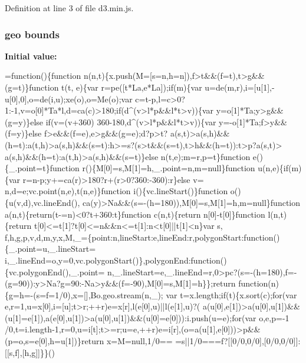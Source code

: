 Definition at line 3 of file d3.\+min.\+js.

\subsubsection[{bounds}]{ {\bf geo} bounds}\label{d3_8min_8js_a55fcc96d050b51f3db051ef3876a8720}
{\bfseries Initial value\+:}
\begin{DoxyCode}
=\textcolor{keyword}{function}()\{\textcolor{keyword}{function} n(n,t)\{x.push(M=[s=n,h=n]),f>t&&(f=t),t>g&&(g=t)\}\textcolor{keyword}{function} t(t,
      e)\{var r=pe([t*La,e*La]);\textcolor{keywordflow}{if}(m)\{var u=de(m,r),i=[u[1],-u[0],0],o=de(i,u);xe(o),o=Me(o);var 
      c=t-p,l=c>0?1:-1,v=o[0]*Ta*l,d=ca(c)>180;\textcolor{keywordflow}{if}(d^(v>l*p&&l*t>v))\{var y=o[1]*Ta;y>g&&(g=y)\}\textcolor{keywordflow}{else} \textcolor{keywordflow}{if}(v=(v+360)%
      360-180,d^(v>l*p&&l*t>v))\{var y=-o[1]*Ta;f>y&&(f=y)\}\textcolor{keywordflow}{else} f>e&&(f=e),e>g&&(g=e);d?p>t?
      a(s,t)>a(s,h)&&(h=t):a(t,h)>a(s,h)&&(s=t):h>=s?(s>t&&(s=t),t>h&&(h=t)):t>p?a(s,t)>
      a(s,h)&&(h=t):a(t,h)>a(s,h)&&(s=t)\}\textcolor{keywordflow}{else} n(t,e);m=r,p=t\}\textcolor{keyword}{function} e()\{\_.point=t\}\textcolor{keyword}{function} 
      r()\{M[0]=s,M[1]=h,\_.point=n,m=null\}\textcolor{keyword}{function} u(n,e)\{\textcolor{keywordflow}{if}(m)\{var r=n-p;y+=ca(r)>180?r+(r>0?360:-360):r\}\textcolor{keywordflow}{else} v=
      n,d=e;vc.point(n,e),t(n,e)\}\textcolor{keyword}{function} i()\{vc.lineStart()\}\textcolor{keyword}{function} o()\{u(v,d),vc.lineEnd(),
      ca(y)>Na&&(s=-(h=180)),M[0]=s,M[1]=h,m=null\}\textcolor{keyword}{function} a(n,t)\{\textcolor{keywordflow}{return}(t-=n)<0?t+360:t\}\textcolor{keyword}{function} 
      c(n,t)\{\textcolor{keywordflow}{return} n[0]-t[0]\}\textcolor{keyword}{function} l(n,t)\{\textcolor{keywordflow}{return} t[0]<=t[1]?t[0]<=n&&n<=t[1]:n<t[0]||t[1]<n\}var s,
      f,h,g,p,v,d,m,y,x,M,\_=\{point:n,lineStart:e,lineEnd:r,polygonStart:\textcolor{keyword}{function}()\{\_.point=u,\_.lineStart=
      i,\_.lineEnd=o,y=0,vc.polygonStart()\},polygonEnd:\textcolor{keyword}{function}()\{vc.polygonEnd(),\_.point=
      n,\_.lineStart=e,\_.lineEnd=r,0>pc?(s=-(h=180),f=-(g=90)):y>Na?g=90:-Na>y&&(f=-90),M[0]=s,M[1]=h\}\};\textcolor{keywordflow}{return} \textcolor{keyword}{
      function}(n)\{g=h=-(s=f=1/0),x=[],Bo.geo.stream(n,\_);
var t=x.length;\textcolor{keywordflow}{if}(t)\{x.sort(c);\textcolor{keywordflow}{for}(var e,r=1,u=x[0],i=[u];t>r;++r)e=x[r],l(e[0],u)||l(e[1],u)?(
      a(u[0],e[1])>a(u[0],u[1])&&(u[1]=e[1]),a(e[0],u[1])>a(u[0],u[1])&&(u[0]=e[0])):i.push(u=e);\textcolor{keywordflow}{for}(var o,e,p=-1
      /0,t=i.length-1,r=0,u=i[t];t>=r;u=e,++r)e=i[r],(o=a(u[1],e[0]))>p&&(p=o,s=e[0],h=u[1])\}\textcolor{keywordflow}{return} x=M=null,1/0==
      =s||1/0===f?[[0/0,0/0],[0/0,0/0]]:[[s,f],[h,g]]\}\}()
\end{DoxyCode}


